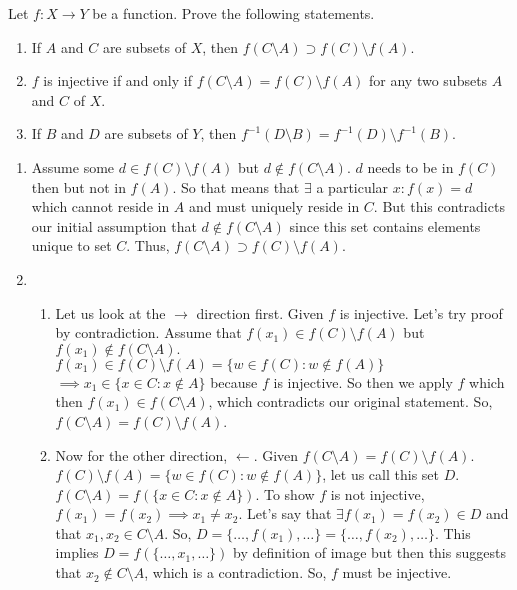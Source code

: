 \documentclass[12pt,letterpaper,boxed]{hmcpset}
\begin{document}
\begin{problem}[Exercise 3.6.]
Let $f: X \rightarrow Y$ be a function. Prove the following statements.
\vspace{-2mm}
\begin{enumerate}
	\itemsep0em
	\item If $A$ and $C$ are subsets of $X$, then $f(C\setminus A)\supset f(C)\setminus f(A)$.
	\item $f$ is injective if and only if $f(C\setminus A) = f(C)\setminus f(A)$ for any two subsets $A$ and $C$ of $X.$
	\item If $B$ and $D$ are subsets of $Y$, then $f^{-1}(D\setminus B)= f^{-1}(D)\setminus f^{-1}(B).$ 
\end{enumerate}
\end{problem}
\begin{solution}
\vspace{-2mm}
\begin{enumerate}
	\itemsep0em
	\item Assume some $d \in f(C)\setminus f(A)$ but $d \notin f(C\setminus A).$ $d$ needs to be in $f(C)$ then but not in $f(A).$ So that means that $\exists$ a particular $x : f(x)=d$ which cannot reside in $A$ and must uniquely reside in $C$. But this contradicts our initial assumption that $d \notin f(C\setminus A)$ since this set contains elements unique to set $C.$ Thus, $f(C\setminus A)\supset f(C)\setminus f(A)$. 
	\item 
		\begin{enumerate}
			\itemsep0em
		\item  Let us look at the $\rightarrow$ direction first. Given $f$ is injective. Let's try proof by contradiction. Assume that $f(x_1) \in f(C)\setminus f(A)$ but $f(x_1) \notin f(C\setminus A).$  $f(x_1) \in f(C)\setminus f(A) = \{w \in f(C) : w \notin f(A)\}$ $\implies x_1\in \{x\in C : x\notin A\}$ because $f$ is injective. So then we apply $f$ which then $f(x_1)\in f(C\setminus A)$, which contradicts our original statement. So, $f(C\setminus A) = f(C)\setminus f(A)$.
		\item Now for the other direction, $\leftarrow$. Given $f(C\setminus A) = f(C)\setminus f(A)$. $f(C)\setminus f(A)=\{w \in f(C) : w \notin f(A)\}$, let us call this set $D$. $f(C\setminus A)=f(\{x \in C : x \notin A\})$. To show $f$ is not injective, $f(x_1)=f(x_2) \implies x_1 \neq x_2$. Let's say that $\exists f(x_1)=f(x_2)\in D$ and that $x_1, x_2 \in C \setminus A$. So, $D=\{\dots,f(x_1),\dots\}=\{\dots,f(x_2),\dots\}.$ This implies $D=f(\{\dots,x_1,\dots\})$ by definition of image but then this suggests that $x_2 \notin C\setminus A$, which is a contradiction. So, $f$ must be injective. 

\end{enumerate}
\end{enumerate}
\end{solution}
\end{document}
